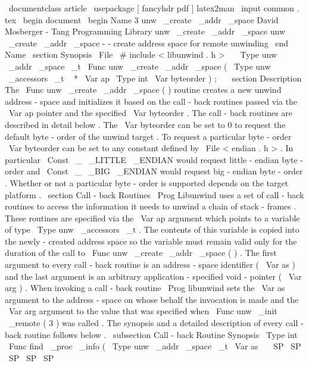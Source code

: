 \
documentclass
{
article
}
\
usepackage
[
fancyhdr
pdf
]
{
latex2man
}
\
input
{
common
.
tex
}
\
begin
{
document
}
\
begin
{
Name
}
{
3
}
{
unw
\
_create
\
_addr
\
_space
}
{
David
Mosberger
-
Tang
}
{
Programming
Library
}
{
unw
\
_create
\
_addr
\
_space
}
unw
\
_create
\
_addr
\
_space
-
-
create
address
space
for
remote
unwinding
\
end
{
Name
}
\
section
{
Synopsis
}
\
File
{
\
#
include
<
libunwind
.
h
>
}
\
\
\
Type
{
unw
\
_addr
\
_space
\
_t
}
\
Func
{
unw
\
_create
\
_addr
\
_space
}
(
\
Type
{
unw
\
_accessors
\
_t
~
*
}
\
Var
{
ap
}
\
Type
{
int
}
\
Var
{
byteorder
}
)
;
\
\
\
section
{
Description
}
The
\
Func
{
unw
\
_create
\
_addr
\
_space
}
(
)
routine
creates
a
new
unwind
address
-
space
and
initializes
it
based
on
the
call
-
back
routines
passed
via
the
\
Var
{
ap
}
pointer
and
the
specified
\
Var
{
byteorder
}
.
The
call
-
back
routines
are
described
in
detail
below
.
The
\
Var
{
byteorder
}
can
be
set
to
0
to
request
the
default
byte
-
order
of
the
unwind
target
.
To
request
a
particular
byte
-
order
\
Var
{
byteorder
}
can
be
set
to
any
constant
defined
by
\
File
{
<
endian
.
h
>
}
.
In
particular
\
Const
{
\
_
\
_LITTLE
\
_ENDIAN
}
would
request
little
-
endian
byte
-
order
and
\
Const
{
\
_
\
_BIG
\
_ENDIAN
}
would
request
big
-
endian
byte
-
order
.
Whether
or
not
a
particular
byte
-
order
is
supported
depends
on
the
target
platform
.
\
section
{
Call
-
back
Routines
}
\
Prog
{
Libunwind
}
uses
a
set
of
call
-
back
routines
to
access
the
information
it
needs
to
unwind
a
chain
of
stack
-
frames
.
These
routines
are
specified
via
the
\
Var
{
ap
}
argument
which
points
to
a
variable
of
type
\
Type
{
unw
\
_accessors
\
_t
}
.
The
contents
of
this
variable
is
copied
into
the
newly
-
created
address
space
so
the
variable
must
remain
valid
only
for
the
duration
of
the
call
to
\
Func
{
unw
\
_create
\
_addr
\
_space
}
(
)
.
The
first
argument
to
every
call
-
back
routine
is
an
address
-
space
identifier
(
\
Var
{
as
}
)
and
the
last
argument
is
an
arbitrary
application
-
specified
void
-
pointer
(
\
Var
{
arg
}
)
.
When
invoking
a
call
-
back
routine
\
Prog
{
libunwind
}
sets
the
\
Var
{
as
}
argument
to
the
address
-
space
on
whose
behalf
the
invocation
is
made
and
the
\
Var
{
arg
}
argument
to
the
value
that
was
specified
when
\
Func
{
unw
\
_init
\
_remote
}
(
3
)
was
called
.
The
synopsis
and
a
detailed
description
of
every
call
-
back
routine
follows
below
.
\
subsection
{
Call
-
back
Routine
Synopsis
}
\
Type
{
int
}
\
Func
{
find
\
_proc
\
_info
}
(
\
Type
{
unw
\
_addr
\
_space
\
_t
}
\
Var
{
as
}
\
\
\
SP
\
SP
\
SP
\
SP
\
SP
\
